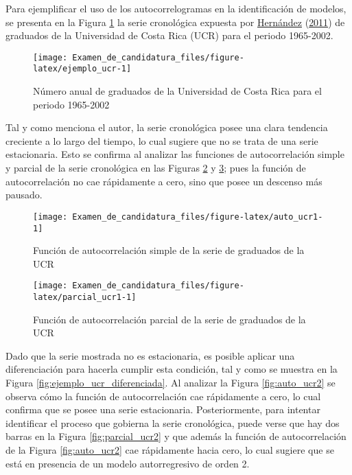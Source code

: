 \documentclass[
]{article}
\begin{document}
Para ejemplificar el uso de los autocorrelogramas en la identificación
de modelos, se presenta en la Figura \ref{fig:ejemplo_ucr} la serie
cronológica expuesta por \protect\hyperlink{ref-oscarh-1}{Hernández}
(\protect\hyperlink{ref-oscarh-1}{2011}) de graduados de la Universidad
de Costa Rica (UCR) para el periodo 1965-2002.

\begin{figure}[H]
\texttt{[image: Examen\_de\_candidatura\_files/figure-latex/ejemplo\_ucr-1]} \caption{Número anual de graduados de la Universidad de Costa Rica para el periodo 1965-2002}\label{fig:ejemplo_ucr}
\end{figure}

Tal y como menciona el autor, la serie cronológica posee una clara
tendencia creciente a lo largo del tiempo, lo cual sugiere que no se
trata de una serie estacionaria. Esto se confirma al analizar las
funciones de autocorrelación simple y parcial de la serie cronológica en
las Figuras \ref{fig:auto_ucr1} y \ref{fig:parcial_ucr1}; pues la
función de autocorrelación no cae rápidamente a cero, sino que posee un
descenso más pausado.

\begin{figure}[H]
\texttt{[image: Examen\_de\_candidatura\_files/figure-latex/auto\_ucr1-1]} \caption{Función de autocorrelación simple de la serie de graduados de la UCR}\label{fig:auto_ucr1}
\end{figure}

\begin{figure}[H]
\texttt{[image: Examen\_de\_candidatura\_files/figure-latex/parcial\_ucr1-1]} \caption{Función de autocorrelación parcial de la serie de graduados de la UCR}\label{fig:parcial_ucr1}
\end{figure}

Dado que la serie mostrada no es estacionaria, es posible aplicar una
diferenciación para hacerla cumplir esta condición, tal y como se
muestra en la Figura \ref{fig:ejemplo_ucr_diferenciada}. Al analizar la
Figura \ref{fig:auto_ucr2} se observa cómo la función de autocorrelación
cae rápidamente a cero, lo cual confirma que se posee una serie
estacionaria. Posteriormente, para intentar identificar el proceso que
gobierna la serie cronológica, puede verse que hay dos barras en la
Figura \ref{fig:parcial_ucr2} y que además la función de autocorrelación
de la Figura \ref{fig:auto_ucr2} cae rápidamente hacia cero, lo cual
sugiere que se está en presencia de un modelo autorregresivo de orden 2.
\end{document}
